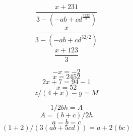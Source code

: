 \documentclass{article}
\begin{document}
\[ \frac{x+231}{3-(-ab + cd^\frac{3222}{2})} \]
\[ \frac{x}{3-(-ab + cd^{32/2})} \]
\[ \frac{x+123}{3} \]

\[ -x = -2 \]
\[ x=2452 \] 
\[ 2x + 7 = 94 - 1 \] 
\[ x = 52 \] 
\[ z/(4 + x) - y = M \]

\[ 1/2bh = A \]
\[ A = (b+c)/2h \]
\[ a=b=c \]
\[ (1+2)/(3(ab+5cd))=a+2(bc) \]
\end{document}
